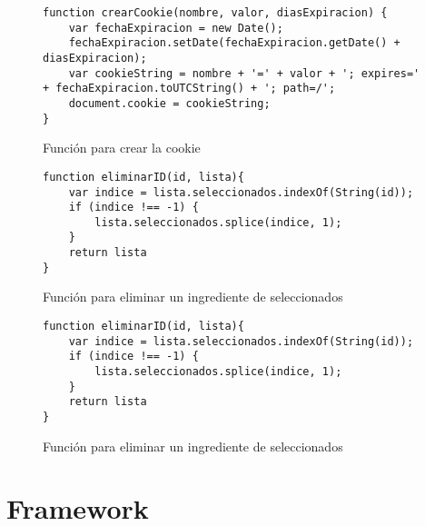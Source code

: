 \begin{figure}[H]
\begin{lstlisting}[style=consola]
function crearCookie(nombre, valor, diasExpiracion) {
    var fechaExpiracion = new Date();
    fechaExpiracion.setDate(fechaExpiracion.getDate() + diasExpiracion);
    var cookieString = nombre + '=' + valor + '; expires=' + fechaExpiracion.toUTCString() + '; path=/';
    document.cookie = cookieString;
}
\end{lstlisting}
\caption{Función para crear la cookie}
\label{sni:cookie-Crear}
\end{figure}

\begin{figure}[H]
\begin{lstlisting}[style=consola]
function eliminarID(id, lista){
    var indice = lista.seleccionados.indexOf(String(id));
    if (indice !== -1) {
        lista.seleccionados.splice(indice, 1);
    }
    return lista
}
\end{lstlisting}
\caption{Función para eliminar un ingrediente de seleccionados}
\label{sni:seleccionados-eliminar}
\end{figure}

\begin{figure}[H]
\begin{lstlisting}[style=consola]
    function eliminarID(id, lista){
    var indice = lista.seleccionados.indexOf(String(id));
    if (indice !== -1) {
        lista.seleccionados.splice(indice, 1);
    }
    return lista
}
\end{lstlisting}
\caption{Función para eliminar un ingrediente de seleccionados}
\label{sni:seleccionados-eliminar}
\end{figure}

\section{Framework}

